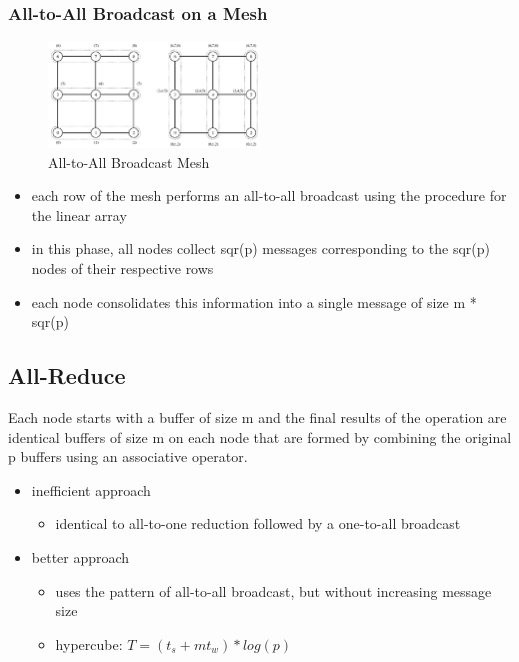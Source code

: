 \hypertarget{all-to-all-broadcast-on-a-mesh}{%
\subsubsection{All-to-All Broadcast on a
Mesh}\label{all-to-all-broadcast-on-a-mesh}}

\begin{figure}[H]
\centering
\includegraphics[width=0.5\textwidth]{figures/all-to-all-broadcast-mesh.png}
\caption{All-to-All Broadcast Mesh}
\end{figure}

\begin{itemize}
\tightlist
\item
  each row of the mesh performs an all-to-all broadcast using the
  procedure for the linear array
\item
  in this phase, all nodes collect sqr(p) messages corresponding to the
  sqr(p) nodes of their respective rows
\item
  each node consolidates this information into a single message of size
  m * sqr(p)
\end{itemize}

\clearpage
\hypertarget{all-reduce}{%
\subsection{All-Reduce}\label{all-reduce}}

Each node starts with a buffer of size m and the final results of the
operation are identical buffers of size m on each node that are formed
by combining the original p buffers using an associative operator.

\begin{itemize}
\tightlist
\item
  inefficient approach

  \begin{itemize}
  \tightlist
  \item
    identical to all-to-one reduction followed by a one-to-all broadcast
  \end{itemize}
\item
  better approach

  \begin{itemize}
  \tightlist
  \item
    uses the pattern of all-to-all broadcast, but without increasing
    message size
  \item
    hypercube: $T = (t_s + mt_w) * log(p)$
  \end{itemize}
\end{itemize}

